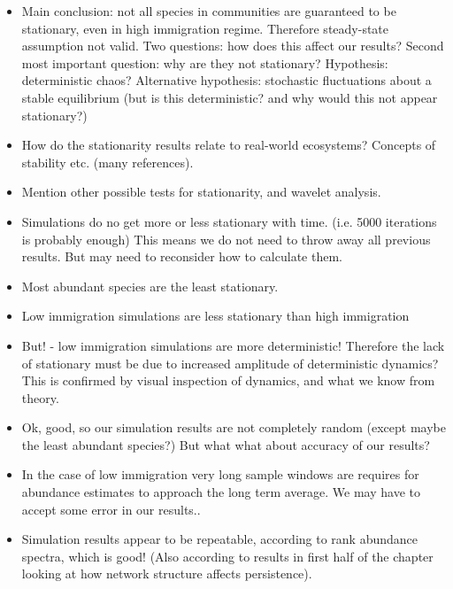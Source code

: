 \begin{itemize}
	\item Main conclusion: not all species in communities are guaranteed to be stationary, even in high immigration regime. Therefore steady-state assumption not valid. Two questions: how does this affect our results?  Second most important question: why are they not stationary? Hypothesis: deterministic chaos? Alternative hypothesis: stochastic fluctuations about a stable equilibrium (but is this deterministic? and why would this not appear stationary?) 
	
	\item How do the stationarity results relate to real-world ecosystems? Concepts of stability etc. (many references).

	\item Mention other possible tests for stationarity, and wavelet analysis.
	
	\item Simulations do no get more or less stationary with time. (i.e. 5000 iterations is probably enough) This means we do not need to throw away all previous results. But may need to reconsider how to calculate them.
	
	\item Most abundant species are the least stationary. 
	\item Low immigration simulations are less stationary than high immigration
	
	\item But! - low immigration simulations are more deterministic! Therefore the lack of stationary must be due to increased amplitude of deterministic dynamics? This is confirmed by visual inspection of dynamics, and what we know from theory.
	
	\item Ok, good, so our simulation results are not completely random (except maybe the least abundant species?) But what what about accuracy of our results?
	
	\item In the case of low immigration very long sample windows are requires for abundance estimates to approach the long term average. We may have to accept some error in our results..
	
	\item Simulation results appear to be repeatable, according to rank abundance spectra, which is good! (Also according to results in first half of the chapter looking at how network structure affects persistence).
\end{itemize}



